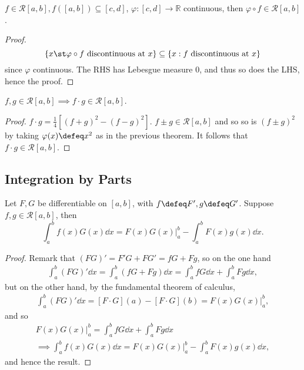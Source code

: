 \begin{theorem}[Composition]
    $f \in \mathcal{R}[a, b], f([a, b]) \subseteq [c, d]$, $\varphi : [c, d] \to \mathbb{R}$ continuous, then $\varphi \circ f \in \mathcal{R}[a, b]$.
\end{theorem}
\begin{proof}
    \[
    \{x \st \varphi \circ f \text{ discontinuous at }x \}    \subseteq \{x : f \text{ discontinuous at } x\}
    \]
    since $\varphi$ continuous. The RHS has Lebesgue measure $0$, and thus so does the LHS, hence the proof.
\end{proof}

\begin{theorem}
    $f, g \in \mathcal{R}[a, b] \implies f \cdot g \in \mathcal{R}[a, b]$.
\end{theorem}
\begin{proof}
    $f \cdot g = \frac{1}{4} \left[(f + g)^2 - (f - g)^2\right]$. $f \pm g \in \mathcal{R}[a, b]$  and so so is $(f \pm g)^2$ by taking $\varphi(x) \defeq x^2$ as in the previous theorem. It follows that $f \cdot g \in \mathcal{R}[a, b]$.
\end{proof}

\subsection{Integration by Parts}
\begin{theorem}
    Let $F, G$ be differentiable on $[a, b]$, with $f \defeq F', g \defeq G'$. Suppose $f, g \in \mathcal{R}[a, b]$, then \[
    \int_a^b f(x) G(x) \dd{x} = F(x)G(x)\vert_{a}^b - \int_a^b F(x) g(x) \dd{x} .
    \]
\end{theorem}
\begin{proof}
    Remark that $(FG)' = F'G + FG' = fG + Fg$, so on the one hand \begin{align*}
        \int_{a}^b (FG)'\dd{x} = \int_a^b (fG + Fg) \dd{x} = \int_a^b fG \dd{x} + \int_{a}^b Fg \dd{x},
    \end{align*}
    but on the other hand, by the fundamental theorem of calculus,
    \begin{align*}
        \int_a^b (FG)' \dd{x} = [F\cdot G](a) - [F\cdot G](b) = F(x)G(x)\vert_a^b,
    \end{align*}
    and so \begin{align*}
        F(x)G(x)\vert_a^b = \int_a^b fG \dd{x} + \int_{a}^b Fg \dd{x}\\
        \implies \int_a^b f(x) G(x) \dd{x} = F(x)G(x) \vert_a^b - \int_a^b F(x) g(x) \dd{x},
    \end{align*}
    and hence the result.
\end{proof}

